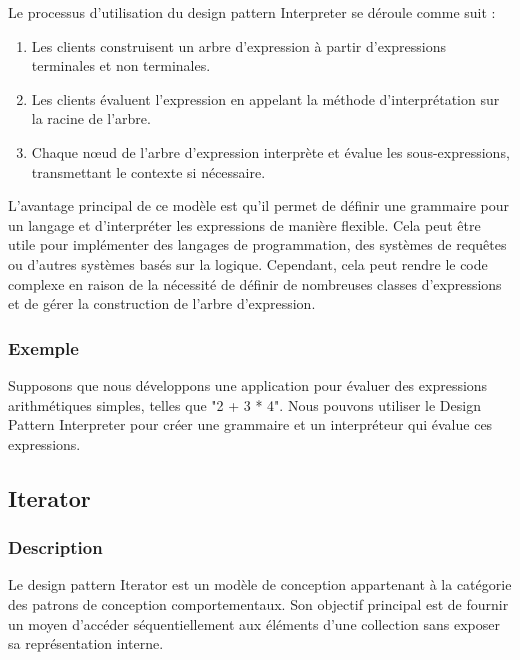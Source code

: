 \documentclass[french]{article}
\begin{document}
Le processus d'utilisation du design pattern Interpreter se déroule comme suit :

\begin{enumerate}
    \item Les clients construisent un arbre d'expression à partir d'expressions terminales et non terminales.
    \item Les clients évaluent l'expression en appelant la méthode d'interprétation sur la racine de l'arbre.
    \item Chaque nœud de l'arbre d'expression interprète et évalue les sous-expressions, transmettant le contexte si nécessaire.
\end{enumerate}

L'avantage principal de ce modèle est qu'il permet de définir une grammaire pour un langage et d'interpréter les expressions de manière flexible. Cela peut être utile pour implémenter des langages de programmation, des systèmes de requêtes ou d'autres systèmes basés sur la logique. Cependant, cela peut rendre le code complexe en raison de la nécessité de définir de nombreuses classes d'expressions et de gérer la construction de l'arbre d'expression.


\subsubsection{Exemple}

Supposons que nous développons une application pour évaluer des expressions arithmétiques simples, telles que "2 + 3 * 4". Nous pouvons utiliser le Design Pattern Interpreter pour créer une grammaire et un interpréteur qui évalue ces expressions.





\newpage


\subsection{Iterator}

\subsubsection{Description}

Le design pattern Iterator est un modèle de conception appartenant à la catégorie des patrons de conception comportementaux. Son objectif principal est de fournir un moyen d'accéder séquentiellement aux éléments d'une collection sans exposer sa représentation interne.
\end{document}
